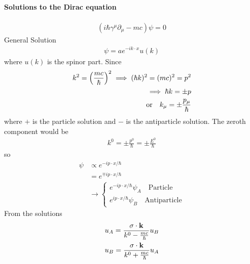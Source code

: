 \documentclass[../main.tex]{subfiles}
\begin{document}
\paragraph*{Solutions to the Dirac equation}
\begin{align*}
    (i\hbar \gamma^\mu \partial_\mu - mc) \psi = 0
\end{align*}
General Solution
\begin{align*}
    \psi = a e^{-i k \cdot x} u(k)
\end{align*}
where $u(k)$ is the spinor part. Since
\begin{align*}
    k^2 = \qt(\frac{mc}{\hbar})^2 \implies (\hbar k)^2 = (mc)^2 = p^2 \\
    \implies \hbar k = \pm p \\
    \qor k_\mu = \pm \frac{p_\mu}{\hbar}
\end{align*}
where $+$ is the particle solution and $-$ is the antiparticle solution. The zeroth component would be
\begin{align*}
    k^0 = \pm \frac{p^0}{\hbar} = \pm \frac{E^0}{\hbar}
\end{align*}
so
\begin{align*}
    \psi &\propto e^{-i p \cdot x/\hbar} \\
    &= e^{\mp i p \cdot x/\hbar} \\
    &\to \begin{cases}
        e^{-i p \cdot x/\hbar} \psi_A \quad \text{Particle} \\
        e^{i p \cdot x/\hbar} \psi_B \quad \text{Antiparticle}
    \end{cases}
\end{align*}
From the solutions
\begin{align*}
    u_A = \frac{\vb \sigma \cdot \vb k}{k^0 - \frac{mc}{\hbar}} u_B \\
    u_B = \frac{\vb \sigma \cdot \vb k}{k^0 + \frac{mc}{\hbar}} u_A
\end{align*}
\end{document}
